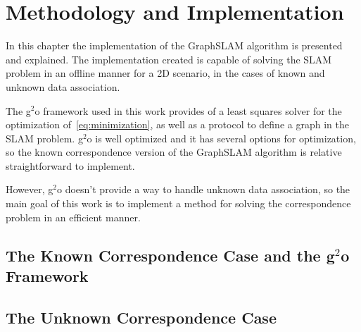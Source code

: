 \chapter{Methodology and Implementation}
\label{chap:implementation}
 
In this chapter the implementation of the GraphSLAM algorithm is presented and explained. The implementation created is capable of solving the SLAM problem in an offline manner for a 2D scenario, in the cases of known and unknown data association.

The g$^2$o framework used in this work provides of a least squares solver for the optimization of~\eqref{eq:minimization}, as well as a protocol to define a graph in the SLAM problem. g$^2$o is well optimized and it has several options for optimization, so the known correspondence version of the GraphSLAM algorithm is relative straightforward to implement.

However, g$^2$o doesn't provide a way to handle unknown data association, so the main goal of this work is to implement a method for solving the correspondence problem in an efficient manner.

\section{The Known Correspondence Case and the g$^2$o Framework}



\section{The Unknown Correspondence Case}